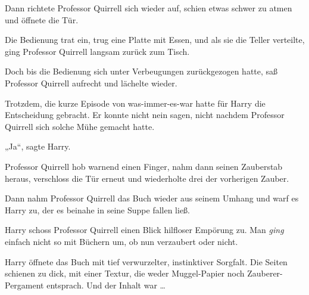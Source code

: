 Dann richtete Professor Quirrell sich wieder auf, schien etwas schwer zu atmen und öffnete die Tür.

Die Bedienung trat ein, trug eine Platte mit Essen, und als sie die Teller verteilte, ging Professor Quirrell langsam zurück zum Tisch.

Doch bis die Bedienung sich unter Verbeugungen zurückgezogen hatte, saß Professor Quirrell aufrecht und lächelte wieder.

Trotzdem, die kurze Episode von was-immer-es-war hatte für Harry die Entscheidung gebracht. Er konnte nicht nein sagen, nicht nachdem Professor Quirrell sich solche Mühe gemacht hatte.

„Ja“, sagte Harry.

Professor Quirrell hob warnend einen Finger, nahm dann seinen Zauberstab heraus, verschloss die Tür erneut und wiederholte drei der vorherigen Zauber.

Dann nahm Professor Quirrell das Buch wieder aus seinem Umhang und warf es Harry zu, der es beinahe in seine Suppe fallen ließ.

Harry schoss Professor Quirrell einen Blick hilfloser Empörung zu. Man \emph{ging} einfach nicht so mit Büchern um, ob nun verzaubert oder nicht.

Harry öffnete das Buch mit tief verwurzelter, instinktiver Sorgfalt. Die Seiten schienen zu dick, mit einer Textur, die weder Muggel-Papier noch Zauberer-Pergament entsprach. Und der Inhalt war …

